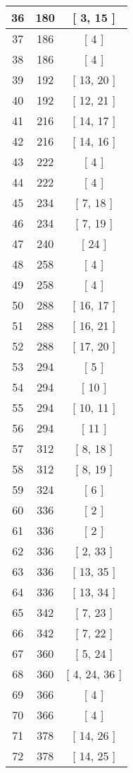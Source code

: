 \begin{center}
\begin{longtable}[H]{|| c c c ||}
36 & 180 & [ 3, 15 ] \\ 
\hline
37 & 186 & [ 4 ] \\ 
\hline
38 & 186 & [ 4 ] \\ 
\hline
39 & 192 & [ 13, 20 ] \\ 
\hline
40 & 192 & [ 12, 21 ] \\ 
\hline
41 & 216 & [ 14, 17 ] \\ 
\hline
42 & 216 & [ 14, 16 ] \\ 
\hline
43 & 222 & [ 4 ] \\ 
\hline
44 & 222 & [ 4 ] \\ 
\hline
45 & 234 & [ 7, 18 ] \\ 
\hline
46 & 234 & [ 7, 19 ] \\ 
\hline
47 & 240 & [ 24 ] \\ 
\hline
48 & 258 & [ 4 ] \\ 
\hline
49 & 258 & [ 4 ] \\ 
\hline
50 & 288 & [ 16, 17 ] \\ 
\hline
51 & 288 & [ 16, 21 ] \\ 
\hline
52 & 288 & [ 17, 20 ] \\ 
\hline
53 & 294 & [ 5 ] \\ 
\hline
54 & 294 & [ 10 ] \\ 
\hline
55 & 294 & [ 10, 11 ] \\ 
\hline
56 & 294 & [ 11 ] \\ 
\hline
57 & 312 & [ 8, 18 ] \\ 
\hline
58 & 312 & [ 8, 19 ] \\ 
\hline
59 & 324 & [ 6 ] \\ 
\hline
60 & 336 & [ 2 ] \\ 
\hline
61 & 336 & [ 2 ] \\ 
\hline
62 & 336 & [ 2, 33 ] \\ 
\hline
63 & 336 & [ 13, 35 ] \\ 
\hline
64 & 336 & [ 13, 34 ] \\ 
\hline
65 & 342 & [ 7, 23 ] \\ 
\hline
66 & 342 & [ 7, 22 ] \\ 
\hline
67 & 360 & [ 5, 24 ] \\ 
\hline
68 & 360 & [ 4, 24, 36 ] \\ 
\hline
69 & 366 & [ 4 ] \\ 
\hline
70 & 366 & [ 4 ] \\ 
\hline
71 & 378 & [ 14, 26 ] \\ 
\hline
72 & 378 & [ 14, 25 ] \\ 

\end{longtable}
\end{center}
